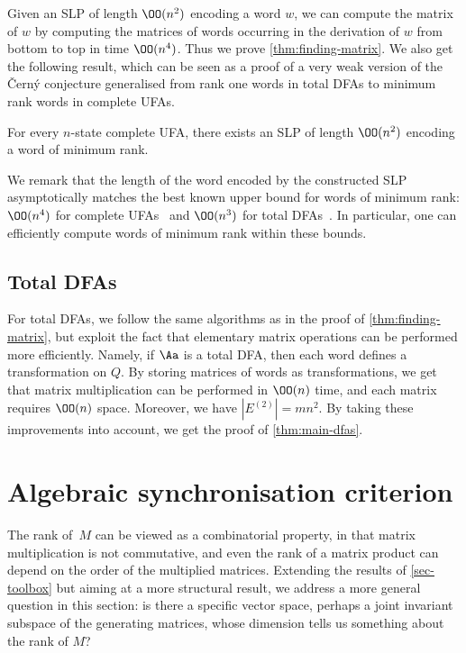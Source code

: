 \noindent
Given an SLP of length $\OO(n^2)$ encoding a word $w$, we can compute the matrix of $w$ by computing the matrices of words occurring in the derivation of $w$ from bottom to top in time $\OO(n^4)$.
Thus we prove \autoref{thm:finding-matrix}. We also get the following result, which can be seen as a proof of a very weak version of the \v{C}ern\'{y} conjecture generalised from rank one words in total DFAs to minimum rank words in complete UFAs.

\begin{thm}
    For every $n$-state complete UFA, there exists an SLP of length $\OO(n^2)$ encoding a word of minimum rank.
\end{thm}

\noindent
We remark that the length of the word encoded by the constructed SLP asymptotically matches the best known upper bound  for words of minimum rank: $\OO(n^4)$ for complete UFAs~\cite{Carpi1988} and $\OO(n^3)$ for total DFAs~\cite{Klyachko1987}. In particular, one can efficiently compute words of minimum rank within these bounds.

\subsection{Total DFAs}\label{subsec-dfas}

For total DFAs, we follow the same algorithms as in the proof of \autoref{thm:finding-matrix}, but exploit the fact that elementary matrix operations can be performed more efficiently. Namely, if $\Aa$ is a total DFA, then each word defines a transformation on $Q$. By storing matrices of words as transformations, we get that matrix multiplication can be performed in $\OO(n)$ time, and each matrix requires $\OO(n)$ space. Moreover, we have $|E^{(2)}| = mn^2$. By taking these improvements into account, we get the proof of \autoref{thm:main-dfas}.




\section{Algebraic synchronisation criterion}\label{sec-algebraic}
The rank of~$M$ can be viewed as a combinatorial property, in that matrix multiplication is not commutative, and even the rank of a matrix product can depend on the order of the multiplied matrices.
Extending the results of \autoref{sec-toolbox} but aiming at a more structural result, we address a more general question in this section: is there a specific vector space, perhaps a joint invariant subspace of the generating matrices, whose dimension tells us something about the rank of $M$? 

